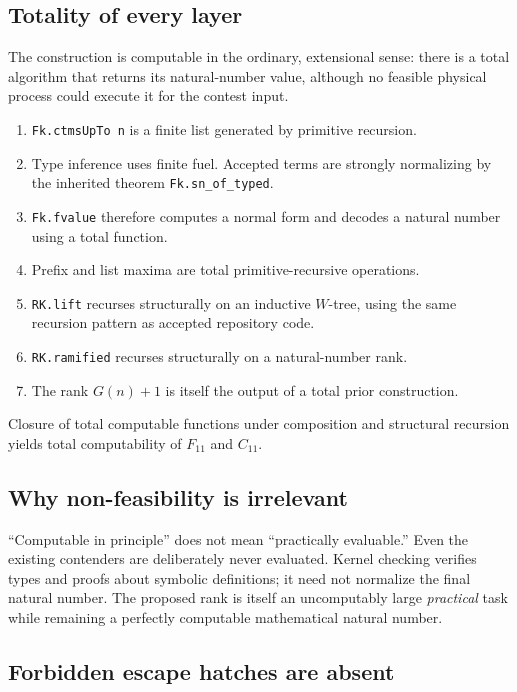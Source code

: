 \documentclass[11pt,oneside]{article}
\theoremstyle{definition}
\newcommand{\code}[1]{\texttt{#1}}
\begin{document}
\subsection{Totality of every layer}

The construction is computable in the ordinary, extensional sense: there is a
total algorithm that returns its natural-number value, although no feasible
physical process could execute it for the contest input.

\begin{enumerate}
  \item \code{Fk.ctmsUpTo n} is a finite list generated by primitive recursion.
  \item Type inference uses finite fuel.  Accepted terms are strongly
        normalizing by the inherited theorem \code{Fk.sn\_of\_typed}.
  \item \code{Fk.fvalue} therefore computes a normal form and decodes a
        natural number using a total function.
  \item Prefix and list maxima are total primitive-recursive operations.
  \item \code{RK.lift} recurses structurally on an inductive $W$-tree, using
        the same recursion pattern as accepted repository code.
  \item \code{RK.ramified} recurses structurally on a natural-number rank.
  \item The rank $G(n)+1$ is itself the output of a total prior construction.
\end{enumerate}

Closure of total computable functions under composition and structural
recursion yields total computability of $F_{11}$ and $C_{11}$.

\subsection{Why non-feasibility is irrelevant}

``Computable in principle'' does not mean ``practically evaluable.''  Even the
existing contenders are deliberately never evaluated.  Kernel checking
verifies types and proofs about symbolic definitions; it need not normalize
the final natural number.  The proposed rank is itself an uncomputably large
\emph{practical} task while remaining a perfectly computable mathematical
natural number.

\subsection{Forbidden escape hatches are absent}
\end{document}

